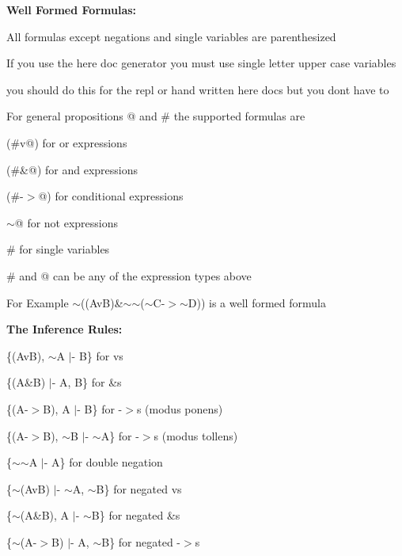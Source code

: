 {\bfseries Well Formed Formulas\+:} 
\begin{DoxyItemize}
\item All formulas except negations and single variables are parenthesized 
\item If you use the here doc generator you must use single letter upper case variables 
\begin{DoxyItemize}
\item you should do this for the repl or hand written here docs but you don\textquotesingle{}t have to
\end{DoxyItemize}
\item For general propositions @ and \# the supported formulas are 
\begin{DoxyItemize}
\item \textquotesingle{}(\#v@)\textquotesingle{} for or expressions 
\item \textquotesingle{}(\#\&@)\textquotesingle{} for and expressions 
\item \textquotesingle{}(\#-\/$>$@)\textquotesingle{} for conditional expressions 
\item \textquotesingle{}$\sim$@\textquotesingle{} for not expressions 
\item \textquotesingle{}\#\textquotesingle{} for single variables 
\item \textquotesingle{}\#\textquotesingle{} and \textquotesingle{}@\textquotesingle{} can be any of the expression types above 
\item For Example $\sim$((AvB)\&$\sim$$\sim$($\sim$\+C-\/$>$$\sim$D)) is a well formed formula 
\end{DoxyItemize}
\end{DoxyItemize}

{\bfseries The Inference Rules\+:} 
\begin{DoxyItemize}
\item \{(AvB), $\sim$A $\vert$-\/ B\} for v\textquotesingle{}s 
\item \{(A\&B) $\vert$-\/ A, B\} for \&\textquotesingle{}s 
\item \{(A-\/$>$B), A $\vert$-\/ B\} for -\/$>$\textquotesingle{}s (modus ponens) 
\item \{(A-\/$>$B), $\sim$B $\vert$-\/ $\sim$A\} for -\/$>$\textquotesingle{}s (modus tollens) 
\item \{$\sim$$\sim$A $\vert$-\/ A\} for double negation 
\item \{$\sim$(AvB) $\vert$-\/ $\sim$A, $\sim$B\} for negated v\textquotesingle{}s 
\item \{$\sim$(A\&B), A $\vert$-\/ $\sim$B\} for negated \&\textquotesingle{}s 
\item \{$\sim$(A-\/$>$B) $\vert$-\/ A, $\sim$B\} for negated -\/$>$\textquotesingle{}s 
\end{DoxyItemize}

